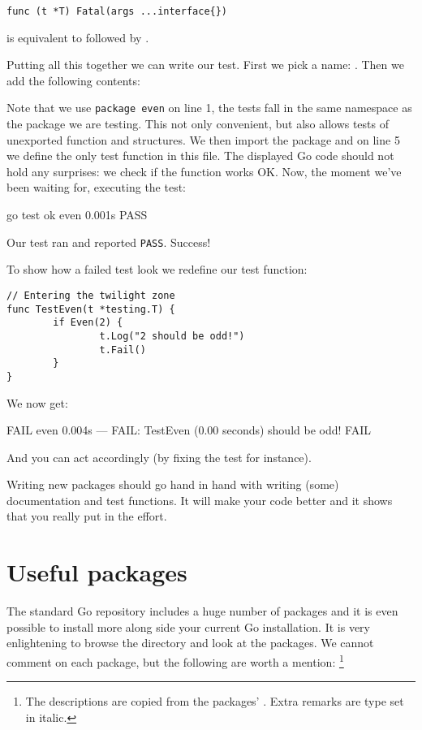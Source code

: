 \begin{lstlisting}[numbers=none]
func (t *T) Fatal(args ...interface{})
\end{lstlisting}
 is equivalent to  followed by .

Putting all this together we can write our test. First
we pick a name: . Then we add the following contents:

Note that we use \lstinline{package even} on line 1, the tests fall in the same
namespace as the package we are testing. This not only convenient, but
also allows tests of unexported function and structures. We then import
the  package and on line 5 we define the only test
function in this file. The displayed Go code should not hold any
surprises: we check if the  function works OK. 
Now, the moment we've been waiting for, executing the test:
\begin{display}
\pr go test
ok      even    0.001s
PASS
\end{display}
\noindent{}Our test ran and reported \texttt{PASS}. Success! 

To show how a failed test look we redefine our test function:
\begin{lstlisting}
// Entering the twilight zone
func TestEven(t *testing.T) {
        if Even(2) {
                t.Log("2 should be odd!")
                t.Fail()
        }   
}
\end{lstlisting}
We now get:
\begin{display}
FAIL    even    0.004s
--- FAIL: TestEven (0.00 seconds)
\qquad{} should be odd!
FAIL
\end{display}
\noindent{}And you can act accordingly (by fixing the test for instance).

\begin{lbar}
Writing new packages should go hand in hand with writing (some)
documentation and test functions. It will make your code better and it
shows that you really put in the effort.
\end{lbar}

\section{Useful packages}
The standard Go repository includes a huge number of packages and it is
even possible to install more along side your current Go installation. 
It is very enlightening to browse the  directory and
look at the packages.
We cannot comment on each package, but the following are worth a mention:
\footnote{The descriptions are copied from the packages' . Extra
remarks are type set in italic.}

